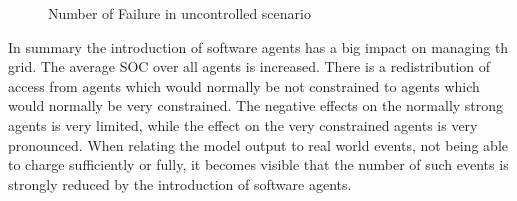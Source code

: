 \documentclass[a4paper]{article}
\begin{document}
\begin{figure}[!ht]
\caption{Number of Failure in uncontrolled scenario}
\label{Failure_uncontrolled_hard}
\end{figure}
\newpage

In summary the introduction of software agents has a big impact on managing th grid. The average SOC over all agents is increased. There is 
a redistribution of access from agents which would normally be not constrained to agents  which would normally be very constrained. The 
negative effects on the normally strong agents is very limited, while the effect on the very constrained agents is very pronounced. 
When relating the model output to real world events, not being able to charge sufficiently or fully, it becomes visible that the number of
such events is strongly reduced by the introduction of software agents.
\end{document}
